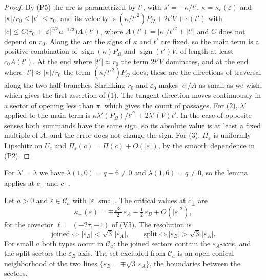 \begin{proof}
By (P5) the arc is parametrized by $t'$, with $s'=-\kappa/t'$, $\kappa=\kappa_c(\varepsilon)$ and
$|\kappa|/r_0\le|t'|\le r_0$, and its velocity is $(\kappa/t'^2)P_\Omega+2t'V+e(t')$ with
$|e|\le C\bigl(r_0+|\varepsilon|^{2/3}a^{-1/3}\bigr)A(t')$, where $A(t')=|\kappa|/t'^2+|t'|$ and $C$ does not depend on $r_0$. Along the arc the signs of $\kappa$ and $t'$ are
fixed, so the main term is a positive combination of $\operatorname{sign}(\kappa)P_\Omega$ and $\operatorname{sign}(t')V$, of length at least $c_0A(t')$.
At the end where $|t'|\approx r_0$ the term $2t'V$ dominates, and at the end where $|t'|\approx|\kappa|/r_0$ the term
$(\kappa/t'^2)P_\Omega$ does; these are the directions of traversal along the two half-branches. Shrinking $r_0$ and $\varepsilon_0$
makes $|e|/A$ as small as we wish, which gives the first assertion of (1). The tangent direction moves continuously
in a sector of opening less than $\pi$, which gives the count of passages. For (2), $\lambda'$ applied to the main term is
$\kappa\lambda'(P_\Omega)/t'^2+2\lambda'(V)t'$. In the case of opposite senses both summands have the same sign, so its absolute value is
at least a fixed multiple of $A$, and the error does not change the sign. For (3), $\Pi_\varepsilon$ is uniformly Lipschitz on
$U_c$ and $\Pi_\varepsilon(c)=\Pi(c)+O(|\varepsilon|)$, by the smooth dependence in (P2).
\end{proof}

For $\lambda'=\lambda$ we have $\lambda(1,0)=q-6\neq0$ and $\lambda(1,6)=q\neq0$, so the lemma applies at $c_+$ and $c_-$.

\begin{proposition}\label{prop:restype}
Let $a>0$ and $\varepsilon\in\mathcal C_a$ with $|\varepsilon|$ small. The critical values at $c_\pm$ are
\[
\kappa_\pm(\varepsilon)=\mp\tfrac{\sqrt3}2\,\varepsilon_A-\tfrac12\,\varepsilon_B+O(|\varepsilon|^2),
\]
for the covector $\ell=(-2\tau,-1)$ of (V5). The resolution is
\[
\text{joined}\iff|\varepsilon_B|<\sqrt3\,|\varepsilon_A|,\qquad\text{split}\iff|\varepsilon_B|>\sqrt3\,|\varepsilon_A| .
\]
For small $a$ both types occur in $\mathcal C_a$: the joined sectors contain the $\varepsilon_A$-axis, and the split sectors the
$\varepsilon_B$-axis. The set excluded from $\mathcal C_a$ is an open conical neighborhood of the two lines $\{\varepsilon_B=\mp\sqrt3\,\varepsilon_A\}$,
the boundaries between the sectors.
\end{proposition}

